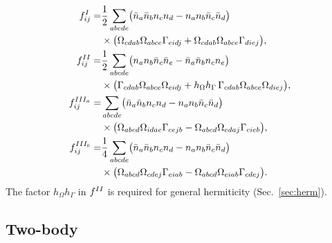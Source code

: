 \documentclass[enabledeprecatedfontcommands]{scrartcl}
\newcommand{\MyRomanNum}[1]{%
  \ifcase#1\or I\or II\or III\or IV\or V\or VI\or VII\or VIII\or IX\or X\else #1\fi}
\begin{document}
\begin{subequations}\label{eq:unfact1b}
\begin{align}
 f^{\MyRomanNum{1}}_{ij}
  =&\frac12\sum_{abcde}
    \bigl(\bar n_a\bar n_b n_c n_d-n_a n_b\bar n_c\bar n_d\bigr)
    \nonumber\\
  &\times\bigl(
    \Omega_{cdab}\Omega_{abce}\Gamma_{eidj}
   +\Omega_{cdab}\Omega_{abce}\Gamma_{diej}
   \bigr),\\
 f^{\MyRomanNum{2}}_{ij}
  =&\frac12\sum_{abcde}
    \bigl(n_a n_b\bar n_c\bar n_e-\bar n_a\bar n_b n_c n_e\bigr)
    \nonumber\\
  &\times\bigl(
    \Gamma_{cdab}\Omega_{abce}\Omega_{eidj}
   +h_\Omega h_\Gamma\,
    \Gamma_{cdab}\Omega_{abce}\Omega_{diej}
   \bigr),\\
 f^{\MyRomanNum{3}_a}_{ij}
  =&\sum_{abcde}
    \bigl(\bar n_a\bar n_b n_c n_d-n_a n_b\bar n_c\bar n_d\bigr)
    \nonumber\\
  &\times\bigl(
    \Omega_{abcd}\Omega_{idae}\Gamma_{cejb}
   -\Omega_{abcd}\Omega_{edaj}\Gamma_{cieb}
   \bigr),\\
 f^{\MyRomanNum{3}_b}_{ij}
  =&\frac14\sum_{abcde}
    \bigl(\bar n_a\bar n_b n_c n_d-n_a n_b\bar n_c\bar n_d\bigr)
    \nonumber\\
  &\times\bigl(
    \Omega_{abcd}\Omega_{cdej}\Gamma_{eiab}
   -\Omega_{abcd}\Omega_{eiab}\Gamma_{cdej}
   \bigr).
\end{align}
\end{subequations}
The factor $h_\Omega h_\Gamma$ in $f^{\MyRomanNum{2}}$ is required for general
hermiticity (Sec.~\ref{sec:herm}).

\subsection{Two-body}
\label{sec:unfact2b}
\end{document}
